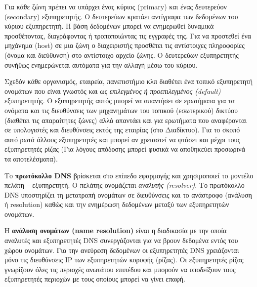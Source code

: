 Για κάθε ζώνη πρέπει να υπάρχει ένας κύριος (primary) και ένας δευτερεύον (secondary) εξυπηρετητής. O δευτερεύων κρατάει αντίγραφα των δεδομένων του κύριου εξυπηρετητή. Η βάση δεδομένων μπορεί να ενημερωθεί δυναμικά προσθέτοντας, διαγράφοντας ή τροποποιώντας τις εγγραφές της. Για να προστεθεί ένα μηχάνημα (host) σε μια ζώνη ο διαχειριστής προσθέτει τις αντίστοιχες πληροφορίες (όνομα και διεύθυνση) στο αντίστοιχο αρχείο ζώνης. Ο δευτερεύων εξυπηρετητής συνήθως ενημερώνεται αυτόματα για την αλλαγή μέσω του κύριου.

Σχεδόν κάθε οργανισμός, εταιρεία, πανεπιστήμιο κλπ διαθέτει ένα τοπικό εξυπηρετητή ονομάτων που είναι γνωστός και ως \emph{επιλεγμένος ή προεπιλεγμένος (default)} εξυπηρετητής. Ο εξυπηρετητής αυτός μπορεί να απαντήσει σε ερωτήματα για τα ονόματα και τις διευθύνσεις των μηχανημάτων του τοπικού (εσωτερικού) δικτύου (διαθέτει τις απαραίτητες ζώνες) αλλά απαντάει και για ερωτήματα που αναφέρονται σε υπολογιστές και διευθύνσεις εκτός της εταιρίας (στο Διαδίκτυο). Για το σκοπό αυτό ρωτά άλλους εξυπηρετητές και μπορεί αν χρειαστεί να φτάσει και μέχρι τους εξυπηρετητές ρίζας (Για λόγους απόδοσης μπορεί φυσικά να αποθηκεύει προσωρινά τα αποτελέσματα).

Το \textbf{πρωτόκολλο DNS} βρίσκεται στο επίπεδο εφαρμογής και χρησιμοποιεί το μοντέλο πελάτη -- εξυπηρετητή. Ο πελάτης ονομάζεται \emph{αναλυτής (resolver)}. Το πρωτόκολλο DNS υποστηρίζει τη μετατροπή ονομάτων σε διευθύνσεις και το ανάστροφο (ανάλυση ή resolution) καθώς και την ενημέρωση δεδομένων μεταξύ των εξυπηρετητών ονομάτων.

Η \textbf{ανάλυση ονομάτων (name resolution)} είναι η διαδικασία με την οποία αναλυτές και εξυπηρετητές DNS συνεργάζονται για να βρουν δεδομένα εντός του χώρου ονομάτων. Για την ανεύρεση δεδομένων οι εξυπηρετητές DNS χρειάζονται μόνο τις διευθύνσεις IP των εξυπηρετητών κορυφής (ρίζας). Οι εξυπηρετητές ρίζας γνωρίζουν όλες τις περιοχές ανωτάτου επιπέδου και μπορούν να υποδείξουν τους εξυπηρετητές περιοχών με τους οποίους μπορεί να γίνει επαφή.